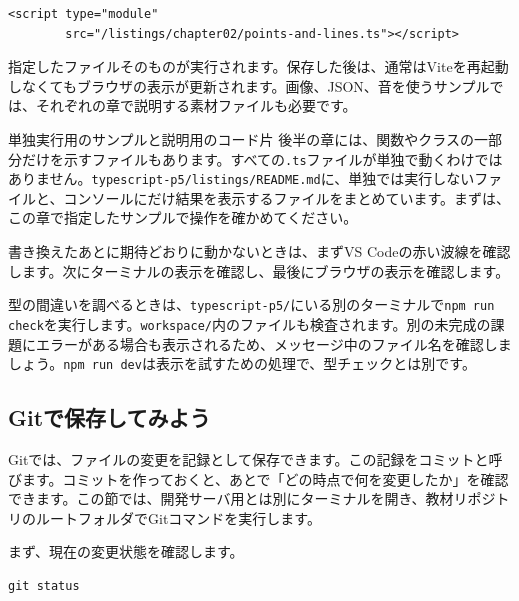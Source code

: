 \begin{listing}[htbp]
\begin{verbatim}
<script type="module"
        src="/listings/chapter02/points-and-lines.ts"></script>
\end{verbatim}
\caption{第2章のサンプルを直接実行する指定}
\label{lst:chapter01-copy-sample}
\end{listing}

指定したファイルそのものが実行されます。保存した後は、通常はViteを再起動しなくてもブラウザの表示が更新されます。画像、JSON、音を使うサンプルでは、それぞれの章で説明する素材ファイルも必要です。

\begin{notebox}{単独実行用のサンプルと説明用のコード片}
後半の章には、関数やクラスの一部分だけを示すファイルもあります。すべての\texttt{.ts}ファイルが単独で動くわけではありません。\texttt{typescript-p5/listings/README.md}に、単独では実行しないファイルと、コンソールにだけ結果を表示するファイルをまとめています。まずは、この章で指定したサンプルで操作を確かめてください。
\end{notebox}

書き換えたあとに期待どおりに動かないときは、まずVS Codeの赤い波線を確認します。次にターミナルの表示を確認し、最後にブラウザの表示を確認します。

型の間違いを調べるときは、\texttt{typescript-p5/}にいる別のターミナルで\texttt{npm run check}を実行します。\texttt{workspace/}内のファイルも検査されます。別の未完成の課題にエラーがある場合も表示されるため、メッセージ中のファイル名を確認しましょう。\texttt{npm run dev}は表示を試すための処理で、型チェックとは別です。

\subsection{Gitで保存してみよう}

Gitでは、ファイルの変更を記録として保存できます。この記録をコミットと呼びます。コミットを作っておくと、あとで「どの時点で何を変更したか」を確認できます。この節では、開発サーバ用とは別にターミナルを開き、教材リポジトリのルートフォルダでGitコマンドを実行します。


まず、現在の変更状態を確認します。

\begin{listing}[htbp]
\begin{verbatim}
git status
\end{verbatim}
\caption{Gitで変更状態を確認するコマンド}
\label{lst:chapter01-git-status}
\end{listing}

